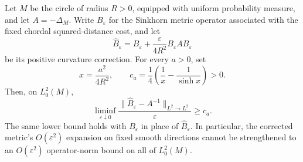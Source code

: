 \begin{proposition}
\label{prop:circle-high-frequency}
Let $M$ be the circle of radius $R>0$, equipped with uniform probability
measure, and let $A=-\Delta_M$.  Write $B_\varepsilon$ for the Sinkhorn
metric operator associated with the fixed chordal squared-distance cost,
and let
\[
 \widehat B_\varepsilon
   =B_\varepsilon+
     \frac{\varepsilon}{4R^2}B_\varepsilon A B_\varepsilon
\]
be its positive curvature correction.  For every $a>0$, set
\[
 x=\frac{a^2}{4R^2},\qquad
 c_a=\frac14\left(\frac1x-\frac1{\sinh x}\right)>0.
\]
Then, on $L^2_0(M)$,
\[
 \liminf_{\varepsilon\downarrow0}
  \frac{\|\widehat B_\varepsilon-A^{-1}\|_{L^2\to L^2}}{\varepsilon}
 \ge c_a.
\]
The same lower bound holds with $B_\varepsilon$ in place of
$\widehat B_\varepsilon$.  In particular, the corrected metric's
$O(\varepsilon^2)$ expansion on fixed smooth directions cannot be
strengthened to an $O(\varepsilon^2)$ operator-norm bound on all of
$L^2_0(M)$.
\end{proposition}

